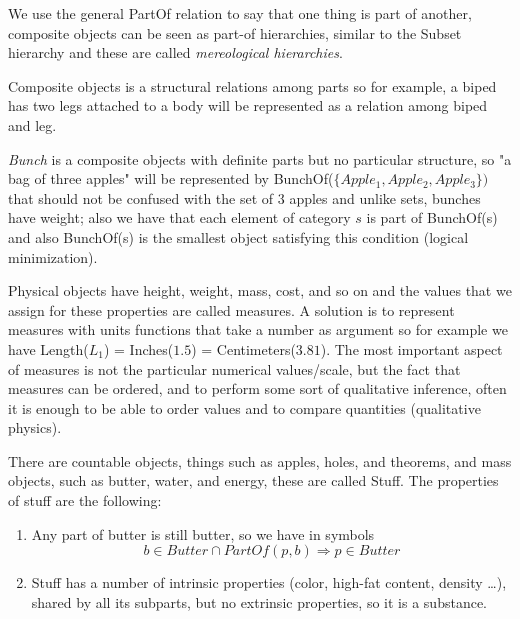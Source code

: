 We use the general PartOf relation to say that one thing is part of another,
composite objects can be seen as part-of hierarchies, similar to the Subset hierarchy
and these are called \emph{mereological hierarchies}.

Composite objects is a structural relations among parts so 
for example, a biped has two legs attached to a body will be represented as a relation
among biped and leg.

\emph{Bunch} is a composite objects with definite parts but no particular structure,
so "a bag of three apples" will be represented by BunchOf($\{Apple_1, Apple_2, Apple_3\})$
that should not be confused with the set of $3$ apples and unlike sets, bunches have
weight; also we have that each element of category $s$ is part of BunchOf(s) and also
BunchOf(s) is the smallest object satisfying this condition (logical minimization).

Physical objects have height, weight, mass, cost, and so on and the values that we
assign for these properties are called measures.\newline
A solution is to represent measures with units functions that take a number as argument
so for example we have Length($L_1$) = Inches($1.5$) = Centimeters($3.81$).\newline
The most important aspect of measures is not the particular numerical
values/scale, but the fact that measures can be ordered, and to perform some sort
of qualitative inference, often it is enough to be able to order values 
and to compare quantities (qualitative physics).

There are countable objects, things such as apples, holes, and theorems, and
mass objects, such as butter, water, and energy, these are called Stuff.\newline
The properties of stuff are the following:
\begin{enumerate}
  \item Any part of butter is still butter, so we have in symbols
	\[ b \in  Butter \cap PartOf(p, b) \Rightarrow  p \in  Butter \]
  \item Stuff has a number of intrinsic properties (color, high-fat content, density \dots        ), shared by all its subparts, but no extrinsic properties, so it is a substance.
\end{enumerate}

